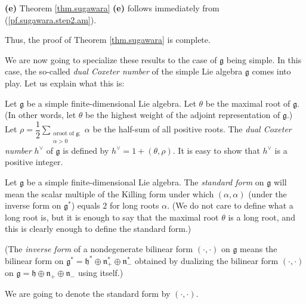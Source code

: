 \documentclass[etingof-lie.tex]{subfiles}
\begin{document}
\textbf{(e)} Theorem \ref{thm.sugawara} \textbf{(e)} follows immediately from
(\ref{pf.sugawara.step2.am}).

Thus, the proof of Theorem \ref{thm.sugawara} is complete.

We are now going to specialize these results to the case of $\mathfrak{g}$
being simple. In this case, the so-called \textit{dual Coxeter number} of the
simple Lie algebra $\mathfrak{g}$ comes into play. Let us explain what this is:

\begin{definition}
\label{def.dualcox}Let $\mathfrak{g}$ be a simple finite-dimensional Lie
algebra. Let $\theta$ be the maximal root of $\mathfrak{g}$. (In other words,
let $\theta$ be the highest weight of the adjoint representation of
$\mathfrak{g}$.) Let $\rho=\dfrac{1}{2}\sum\limits_{\substack{\alpha\text{
root of }\mathfrak{g}\text{;}\\\alpha>0}}\alpha$ be the half-sum of all
positive roots. The \textit{dual Coxeter number} $h^{\vee}$ of $\mathfrak{g}$
is defined by $h^{\vee}=1+\left(  \theta,\rho\right)  $. It is easy to show
that $h^{\vee}$ is a positive integer.
\end{definition}

\begin{definition}
\label{def.standform}Let $\mathfrak{g}$ be a simple finite-dimensional Lie
algebra. The \textit{standard form} on $\mathfrak{g}$ will mean the scalar
multiple of the Killing form under which $\left(  \alpha,\alpha\right)  $
(under the inverse form on $\mathfrak{g}^{\ast}$) equals $2$ for long roots
$\alpha$. (We do not care to define what a long root is, but it is enough to
say that the maximal root $\theta$ is a long root, and this is clearly enough
to define the standard form.)

(The \textit{inverse form} of a nondegenerate bilinear form $\left(
\cdot,\cdot\right)  $ on $\mathfrak{g}$ means the bilinear form on
$\mathfrak{g}^{\ast}=\mathfrak{h}^{\ast}\oplus\mathfrak{n}_{+}^{\ast}%
\oplus\mathfrak{n}_{-}^{\ast}$ obtained by dualizing the bilinear form
$\left(  \cdot,\cdot\right)  $ on $\mathfrak{g}=\mathfrak{h}\oplus
\mathfrak{n}_{+}\oplus\mathfrak{n}_{-}$ using itself.)

We are going to denote the standard form by $\left(  \cdot,\cdot\right)  $.
\end{definition}
\end{document}
